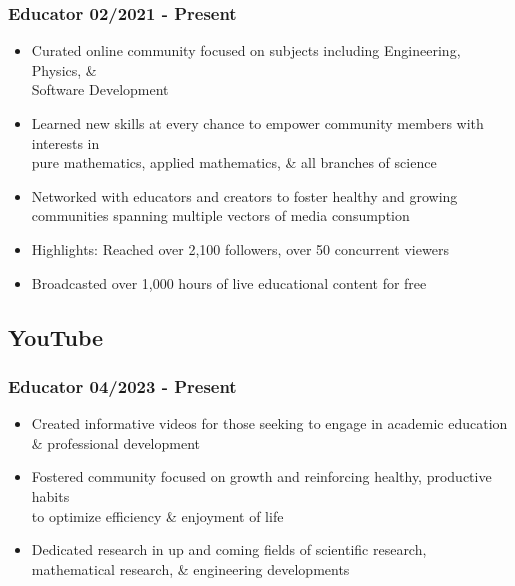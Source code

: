 \documentclass[10pt]{article} %
\begin{document}
\subsubsection{Educator \hfill 02/2021 - Present}
\begin{itemize}
    \item {Curated online community focused on subjects including Engineering,  
        Physics, \& \\ Software Development}
    \item {Learned new skills at every chance to empower community members 
        with interests in \\ pure mathematics, applied mathematics, 
        \& all branches of science}
    \item {Networked with educators and creators to foster healthy and growing 
        communities spanning multiple vectors of media consumption}
    \item {Highlights: Reached over 2,100 followers, over 50 concurrent viewers}
    \item {Broadcasted over 1,000 hours of live educational content for free}
\end{itemize}

\subsection{YouTube}
\subsubsection{Educator \hfill 04/2023 - Present}
\begin{itemize}
    \item {Created informative videos for those seeking to engage in academic 
        education \\ \& professional development}
    \item {Fostered community focused on growth and reinforcing healthy, 
        productive habits \\ to optimize efficiency \& enjoyment of life}
    \item {Dedicated research in up and coming fields of scientific research, \\ 
        mathematical research, \& engineering developments}
\end{itemize}  
\end{document}
